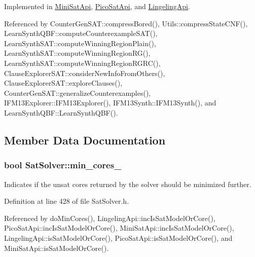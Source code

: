 Implemented in \hyperlink{classMiniSatApi_afe6f184e440ffe7f9b3a86045c15b450}{Mini\-Sat\-Api}, \hyperlink{classPicoSatApi_a5e32634944d14142ab0e2c4fdeb12d85}{Pico\-Sat\-Api}, and \hyperlink{classLingelingApi_a844da6cbdf38b7cc8abd0b1710350be2}{Lingeling\-Api}.



Referenced by Counter\-Gen\-S\-A\-T\-::compress\-Bored(), Utils\-::compress\-State\-C\-N\-F(), Learn\-Synth\-Q\-B\-F\-::compute\-Counterexample\-S\-A\-T(), Learn\-Synth\-S\-A\-T\-::compute\-Winning\-Region\-Plain(), Learn\-Synth\-S\-A\-T\-::compute\-Winning\-Region\-R\-G(), Learn\-Synth\-S\-A\-T\-::compute\-Winning\-Region\-R\-G\-R\-C(), Clause\-Explorer\-S\-A\-T\-::consider\-New\-Info\-From\-Others(), Clause\-Explorer\-S\-A\-T\-::explore\-Clauses(), Counter\-Gen\-S\-A\-T\-::generalize\-Counterexamples(), I\-F\-M13\-Explorer\-::\-I\-F\-M13\-Explorer(), I\-F\-M13\-Synth\-::\-I\-F\-M13\-Synth(), and Learn\-Synth\-Q\-B\-F\-::\-Learn\-Synth\-Q\-B\-F().



\subsection{Member Data Documentation}
\hypertarget{classSatSolver_adfeecebfd09606c82b5c57cfe5aad813}{
\subsubsection[{min\-\_\-cores\-\_\-}]{\setlength{\rightskip}{0pt plus 5cm}bool Sat\-Solver\-::min\-\_\-cores\-\_\-\hspace{0.3cm}{\ttfamily [protected]}}}\label{classSatSolver_adfeecebfd09606c82b5c57cfe5aad813}


Indicates if the unsat cores returned by the solver should be minimized further. 



Definition at line 428 of file Sat\-Solver.\-h.



Referenced by do\-Min\-Cores(), Lingeling\-Api\-::inc\-Is\-Sat\-Model\-Or\-Core(), Pico\-Sat\-Api\-::inc\-Is\-Sat\-Model\-Or\-Core(), Mini\-Sat\-Api\-::inc\-Is\-Sat\-Model\-Or\-Core(), Lingeling\-Api\-::is\-Sat\-Model\-Or\-Core(), Pico\-Sat\-Api\-::is\-Sat\-Model\-Or\-Core(), and Mini\-Sat\-Api\-::is\-Sat\-Model\-Or\-Core().

